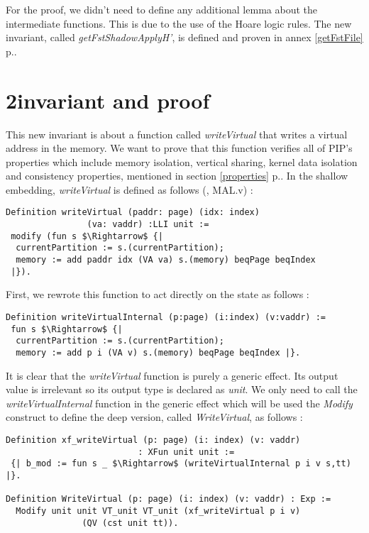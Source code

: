 For the proof, we didn't need to define any additional lemma about the intermediate functions. This is due to the use of the Hoare logic rules. The new invariant, called \textit{getFstShadowApplyH'}, is defined and proven in annex \ref{getFstFile} p.\pageref{getFstFile}.

\section{2\nd invariant and proof} \label{writeInvSec}
This new invariant is about a function called \textit{writeVirtual} that writes a virtual address in the memory. We want to prove that this function verifies all of PIP's properties which include memory isolation, vertical sharing, kernel data isolation and consistency properties, mentioned in section \ref{properties} p.\pageref{properties}. In the shallow embedding, \textit{writeVirtual} is defined as follows (\cite{PIP}, MAL.v) : 
\begin{lstlisting}[caption = {writeVirtual function in the shallow embedding}, xleftmargin=-.05\textwidth,
xrightmargin=-.05\textwidth,mathescape=true, label={writeS}]
Definition writeVirtual (paddr: page) (idx: index) 
		        (va: vaddr) :LLI unit :=
 modify (fun s $\Rightarrow$ {| 
  currentPartition := s.(currentPartition);
  memory := add paddr idx (VA va) s.(memory) beqPage beqIndex 
 |}).
\end{lstlisting} \vspace{4pt}
First, we rewrote this function to act directly on the state as follows :
\begin{lstlisting}[caption = {Rewritten shallow writeVirtual function}, xleftmargin=-.06\textwidth,
xrightmargin=-.06\textwidth,mathescape=true]
Definition writeVirtualInternal (p:page) (i:index) (v:vaddr) :=
 fun s $\Rightarrow$ {| 
  currentPartition := s.(currentPartition);
  memory := add p i (VA v) s.(memory) beqPage beqIndex |}.  
\end{lstlisting} \vspace{4pt}
It is clear that the \textit{writeVirtual} function is purely a generic effect. Its output value is irrelevant so its output type is declared as \textit{unit}. We only need to call the \textit{writeVirtualInternal} function in the generic effect which will be used the \textit{Modify} construct to define the deep version, called \textit{WriteVirtual}, as follows : 
\begin{lstlisting}[caption = {WriteVirtual definition}, xleftmargin=-.07\textwidth,
xrightmargin=-.07\textwidth,mathescape=true, label={writeD}]
Definition xf_writeVirtual (p: page) (i: index) (v: vaddr) 
	                      : XFun unit unit := 
 {| b_mod := fun s _ $\Rightarrow$ (writeVirtualInternal p i v s,tt) |}.

Definition WriteVirtual (p: page) (i: index) (v: vaddr) : Exp :=
  Modify unit unit VT_unit VT_unit (xf_writeVirtual p i v) 
  	           (QV (cst unit tt)).    
\end{lstlisting} \vspace{4pt}

